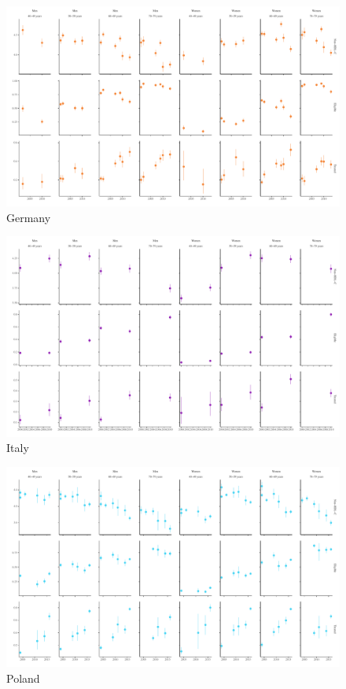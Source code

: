 \documentclass[12pt]{article}
\begin{document}
\begin{appendix}
\begin{landscape}
        \begin{figure}[H]
            \centering
            \includegraphics[width=\linewidth]{../3_figures/countries/fig_germany.pdf}
            \caption{Germany}
            \label{fig:germany}
        \end{figure}

        \begin{figure}[H]
            \centering
            \includegraphics[width=\linewidth]{../3_figures/countries/fig_italy.pdf}
            \caption{Italy}
            \label{fig:italy}
        \end{figure}

        \begin{figure}[H]
            \centering
            \includegraphics[width=\linewidth]{../3_figures/countries/fig_poland.pdf}
            \caption{Poland}
            \label{fig:poland}
        \end{figure}


\end{landscape}
\end{appendix}
\end{document}
